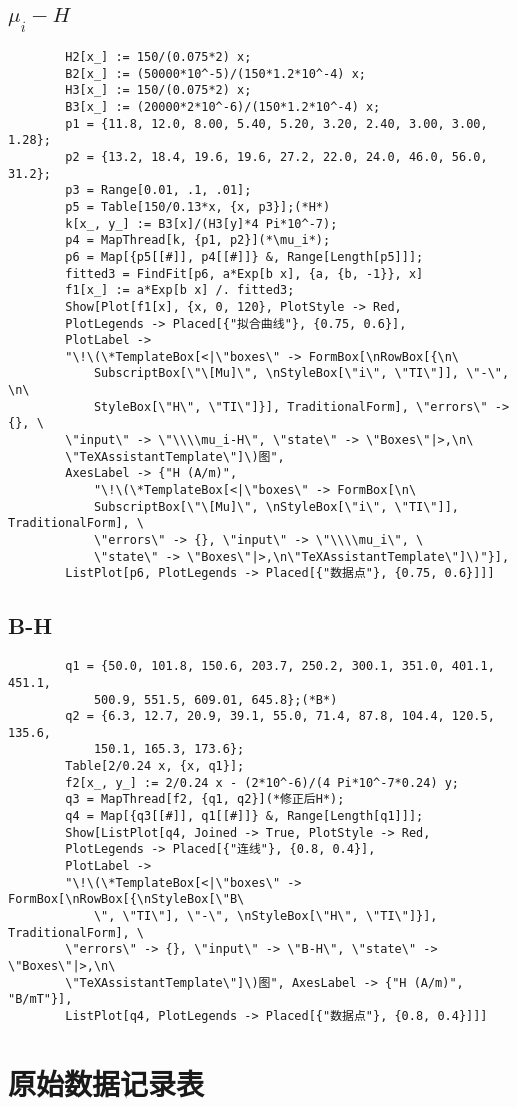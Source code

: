 \documentclass[11pt]{article}
\begin{document}
	\subsection{$\mu_i-H$}
	\begin{lstlisting}
		H2[x_] := 150/(0.075*2) x;
		B2[x_] := (50000*10^-5)/(150*1.2*10^-4) x;
		H3[x_] := 150/(0.075*2) x;
		B3[x_] := (20000*2*10^-6)/(150*1.2*10^-4) x;
		p1 = {11.8, 12.0, 8.00, 5.40, 5.20, 3.20, 2.40, 3.00, 3.00, 1.28};
		p2 = {13.2, 18.4, 19.6, 19.6, 27.2, 22.0, 24.0, 46.0, 56.0, 31.2};
		p3 = Range[0.01, .1, .01];
		p5 = Table[150/0.13*x, {x, p3}];(*H*)
		k[x_, y_] := B3[x]/(H3[y]*4 Pi*10^-7);
		p4 = MapThread[k, {p1, p2}](*\mu_i*);
		p6 = Map[{p5[[#]], p4[[#]]} &, Range[Length[p5]]];
		fitted3 = FindFit[p6, a*Exp[b x], {a, {b, -1}}, x]
		f1[x_] := a*Exp[b x] /. fitted3;
		Show[Plot[f1[x], {x, 0, 120}, PlotStyle -> Red, 
		PlotLegends -> Placed[{"拟合曲线"}, {0.75, 0.6}], 
		PlotLabel -> 
		"\!\(\*TemplateBox[<|\"boxes\" -> FormBox[\nRowBox[{\n\
			SubscriptBox[\"\[Mu]\", \nStyleBox[\"i\", \"TI\"]], \"-\", \n\
			StyleBox[\"H\", \"TI\"]}], TraditionalForm], \"errors\" -> {}, \
		\"input\" -> \"\\\\mu_i-H\", \"state\" -> \"Boxes\"|>,\n\
		\"TeXAssistantTemplate\"]\)图", 
		AxesLabel -> {"H (A/m)", 
			"\!\(\*TemplateBox[<|\"boxes\" -> FormBox[\n\
			SubscriptBox[\"\[Mu]\", \nStyleBox[\"i\", \"TI\"]], TraditionalForm], \
			\"errors\" -> {}, \"input\" -> \"\\\\mu_i\", \
			\"state\" -> \"Boxes\"|>,\n\"TeXAssistantTemplate\"]\)"}], 
		ListPlot[p6, PlotLegends -> Placed[{"数据点"}, {0.75, 0.6}]]]
	\end{lstlisting}
	
	\subsection{B-H}
	\begin{lstlisting}
		q1 = {50.0, 101.8, 150.6, 203.7, 250.2, 300.1, 351.0, 401.1, 451.1, 
			500.9, 551.5, 609.01, 645.8};(*B*)
		q2 = {6.3, 12.7, 20.9, 39.1, 55.0, 71.4, 87.8, 104.4, 120.5, 135.6, 
			150.1, 165.3, 173.6};
		Table[2/0.24 x, {x, q1}];
		f2[x_, y_] := 2/0.24 x - (2*10^-6)/(4 Pi*10^-7*0.24) y;
		q3 = MapThread[f2, {q1, q2}](*修正后H*);
		q4 = Map[{q3[[#]], q1[[#]]} &, Range[Length[q1]]];
		Show[ListPlot[q4, Joined -> True, PlotStyle -> Red, 
		PlotLegends -> Placed[{"连线"}, {0.8, 0.4}], 
		PlotLabel -> 
		"\!\(\*TemplateBox[<|\"boxes\" -> FormBox[\nRowBox[{\nStyleBox[\"B\
			\", \"TI\"], \"-\", \nStyleBox[\"H\", \"TI\"]}], TraditionalForm], \
		\"errors\" -> {}, \"input\" -> \"B-H\", \"state\" -> \"Boxes\"|>,\n\
		\"TeXAssistantTemplate\"]\)图", AxesLabel -> {"H (A/m)", "B/mT"}], 
		ListPlot[q4, PlotLegends -> Placed[{"数据点"}, {0.8, 0.4}]]]
	\end{lstlisting}
	
	\section{原始数据记录表}
	
\end{document}
